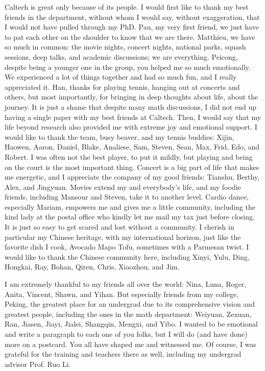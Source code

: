 \documentclass[12pt]{caltech_thesis}
\numberwithin{equation}{section}
\begin{document}
\begin{acknowledgements}
Caltech is great only because of its people. I would first like to thank my best friends in the department, without whom I would say, without exaggeration, that I would not have pulled through my PhD. Pau, my very first friend, we just have to pat each other on the shoulder to know that we are there. Matthieu, we have so much in common: the movie nights, concert nights, national parks, squash sessions, deep talks, and academic discussions; we are everything. Peicong, despite being a younger one in the group, you helped me so much emotionally. We experienced a lot of things together and had so much fun, and I really appreciated it.
Han, thanks for playing tennis, hanging out at concerts and others, but most importantly, for bringing in deep thoughts about life, about the journey. It is just a shame that despite many math discussions, I did not end up having a single paper with my best friends at Caltech. Then, I would say that my life beyond research also provided me with extreme joy and emotional support. I would like to thank the team, busy beaver, and my tennis buddies: Xijin, Haowen, Aaron, Daniel, Blake, Analiese, Sam, Steven, Sean, Max, Frid,  Edo, and Robert. I was often not the best player, to put it mildly, but playing and being on the court is the most important thing. Concert is a big part of life that makes me energetic, and I appreciate the company of my good friends: Tianshu, Berthy, Alex, and Jingyuan. Movies extend my and everybody's life, and my foodie friends, including Mansour and Steven, take it to another level. Cardio dance, especially Mariam, empowers me and gives me a little community, including the kind lady at the postal office who kindly let me mail my tax just before closing. It is just so easy to get scared and lost without a community. I cherish in particular my Chinese heritage, with my international horizon, just like the favorite dish I cook, Avocado Mapo Tofu, sometimes with a Parmesan twist. I would like to thank the Chinese community here, including Xinyi, Yulu, Ding, Hongkai, Ray, Bohan, Qiren, Chris, Xiaozhou, and Jim. 

I am extremely thankful to my friends all over the world: Nina, Luna, Roger, Anita, Vincent, Shawn, and Yihan. But especially 
friends from my college, Peking, the greatest place for an undergrad due to its comprehensive vision and greatest people, including the ones in the math department: Weiyuan, Zexuan, Ran, Jiasen, Jiayi, Jialei,  Shangqin,  Mengxi, and Yibo. I wanted to be emotional and write a paragraph to each one of you folks, but I will do (and have done) more on a postcard. You all have shaped me and witnessed me. Of course, I was grateful for the training and teachers there as well, including my undergrad advisor Prof. Ruo Li.


\end{acknowledgements}
\end{document}
